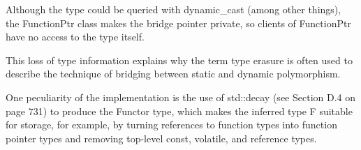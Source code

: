 \begin{tcolorbox}[colback=webgreen!5!white,colframe=webgreen!75!black]
\hspace*{0.75cm}Although the type could be queried with dynamic\_cast (among other things), the FunctionPtr class makes the bridge pointer private, so clients of FunctionPtr have no access to the type itself.
\end{tcolorbox}

This loss of type information explains why the term type erasure is often used to describe the technique of bridging between static and dynamic polymorphism.

One peculiarity of the implementation is the use of std::decay (see Section D.4 on page 731) to produce the Functor type, which makes the inferred type F suitable for storage, for example, by turning references to function types into function pointer types and removing top-level const, volatile, and reference types.







































